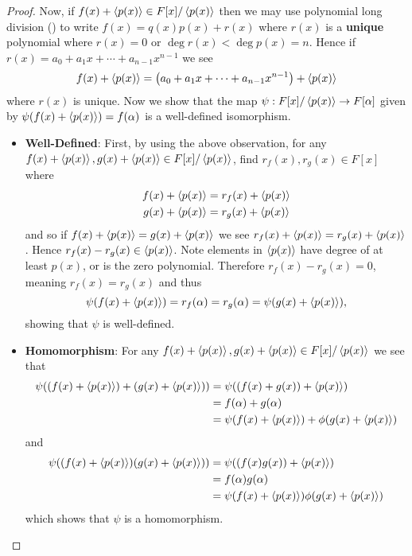 \begin{proof}
    Now, if $f(x) + \left\langle p(x)\right\rangle \in F[x]/\left\langle p(x)\right\rangle$ then we may use polynomial long division () to write $f(x) = q(x)p(x) + r(x)$ where $r(x)$ is a \textbf{unique} polynomial where $r(x) = 0$ or $\deg r(x) < \deg p(x) = n$. Hence if $r(x) = a_0 + a_1x + \cdots + a_{n-1}x^{n-1}$ we see
    \[
        f(x) + \left\langle p(x)\right\rangle = \left(a_0 + a_1x + \cdots + a_{n-1}x^{n-1}\right) + \left\langle p(x)\right\rangle
    \]
    where $r(x)$ is unique. Now we show that the map $\psi: F[x]/\left\langle p(x)\right\rangle \to F[\alpha]$ given by $\psi(f(x) + \left\langle p(x)\right\rangle) = f(\alpha)$ is a well-defined isomorphism.
    \begin{itemize}
        \item \textbf{Well-Defined}: First, by using the above observation, for any $f(x) + \left\langle p(x)\right\rangle, g(x) + \left\langle p(x)\right\rangle \in F[x]/\left\langle p(x)\right\rangle$, find $r_f(x), r_g(x) \in F[x]$ where
        \begin{align*}
            f(x) + \left\langle p(x)\right\rangle &= r_f(x) + \left\langle p(x)\right\rangle\\
            g(x) + \left\langle p(x)\right\rangle &= r_g(x) + \left\langle p(x)\right\rangle
        \end{align*}
        and so if $f(x) + \left\langle p(x)\right\rangle = g(x) + \left\langle p(x)\right\rangle$ we see $r_f(x) + \left\langle p(x)\right\rangle = r_g(x) + \left\langle p(x)\right\rangle$. Hence $r_f(x) - r_g(x) \in \left\langle p(x)\right\rangle$. Note elements in $\left\langle p(x)\right\rangle$ have degree of at least $p(x)$, or is the zero polynomial. Therefore $r_f(x) - r_g(x) = 0$, meaning $r_f(x) = r_g(x)$ and thus
        \[
            \psi(f(x) + \left\langle p(x)\right\rangle) = r_f(\alpha) = r_g(\alpha) = \psi(g(x) + \left\langle p(x)\right\rangle),
        \]
        showing that $\psi$ is well-defined.

        \item \textbf{Homomorphism}: For any $f(x) + \left\langle p(x)\right\rangle, g(x) + \left\langle p(x)\right\rangle \in F[x]/\left\langle p(x)\right\rangle$ we see that
        \begin{align*}
            \psi((f(x) + \left\langle p(x)\right\rangle) + (g(x) + \left\langle p(x)\right\rangle)) &= \psi((f(x) + g(x)) + \left\langle p(x)\right\rangle)\\
            &= f(\alpha) + g(\alpha)\\
            &= \psi(f(x) + \left\langle p(x)\right\rangle) + \phi(g(x) + \left\langle p(x)\right\rangle)
        \end{align*}
        and
        \begin{align*}
            \psi((f(x) + \left\langle p(x)\right\rangle)(g(x) + \left\langle p(x)\right\rangle)) &= \psi((f(x)g(x)) + \left\langle p(x)\right\rangle)\\
            &= f(\alpha)g(\alpha)\\
            &= \psi(f(x) + \left\langle p(x)\right\rangle)\phi(g(x) + \left\langle p(x)\right\rangle)
        \end{align*}
        which shows that $\psi$ is a homomorphism.


\end{itemize}
\end{proof}
